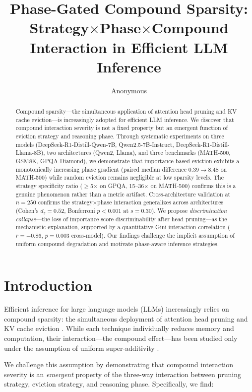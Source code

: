 \documentclass[11pt]{article}
\title{Phase-Gated Compound Sparsity: Strategy$\times$Phase$\times$Compound Interaction in Efficient LLM Inference}
\author{Anonymous}
\date{}
\begin{document}
\maketitle

\begin{abstract}
Compound sparsity---the simultaneous application of attention head pruning and KV cache eviction---is increasingly adopted for efficient LLM inference. We discover that compound interaction severity is not a fixed property but an emergent function of eviction strategy and reasoning phase. Through systematic experiments on three models (DeepSeek-R1-Distill-Qwen-7B, Qwen2.5-7B-Instruct, DeepSeek-R1-Distill-Llama-8B), two architectures (Qwen2, Llama), and three benchmarks (MATH-500, GSM8K, GPQA-Diamond), we demonstrate that importance-based eviction exhibits a monotonically increasing phase gradient (paired median difference 0.39$\to$8.48 on MATH-500) while random eviction remains negligible at low sparsity levels. The strategy specificity ratio ($\geq$5$\times$ on GPQA, 15--36$\times$ on MATH-500) confirms this is a genuine phenomenon rather than a metric artifact. Cross-architecture validation at $n=250$ confirms the strategy$\times$phase interaction generalizes across architectures (Cohen's $d_z=0.52$, Bonferroni $p<0.001$ at $s=0.30$). We propose \emph{discrimination collapse}---the loss of importance score discriminability after head pruning---as the mechanistic explanation, supported by a quantitative Gini-interaction correlation ($r=-0.86$, $p=0.003$ cross-model). Our findings challenge the implicit assumption of uniform compound degradation and motivate phase-aware inference strategies.
\end{abstract}

\section{Introduction}

Efficient inference for large language models (LLMs) increasingly relies on compound sparsity: the simultaneous deployment of attention head pruning and KV cache eviction \citep{spark2024,adakv2024}. While each technique individually reduces memory and computation, their interaction---the compound effect---has been studied only under the assumption of uniform super-additivity \citep{spark2024}.

We challenge this assumption by demonstrating that compound interaction severity is an \emph{emergent} property of the three-way interaction between pruning strategy, eviction strategy, and reasoning phase. Specifically, we find:
\end{document}
